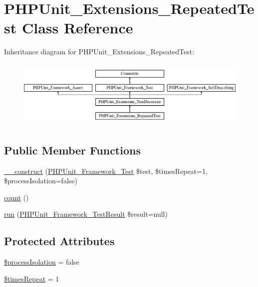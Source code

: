 \hypertarget{class_p_h_p_unit___extensions___repeated_test}{}\section{P\+H\+P\+Unit\+\_\+\+Extensions\+\_\+\+Repeated\+Test Class Reference}
\label{class_p_h_p_unit___extensions___repeated_test}
Inheritance diagram for P\+H\+P\+Unit\+\_\+\+Extensions\+\_\+\+Repeated\+Test\+:\begin{figure}[H]
\begin{center}
\leavevmode
\includegraphics[height=3.303835cm]{class_p_h_p_unit___extensions___repeated_test}
\end{center}
\end{figure}
\subsection*{Public Member Functions}
\begin{DoxyCompactItemize}
\item 
\mbox{\hyperlink{class_p_h_p_unit___extensions___repeated_test_af5e8d5e2fa6ca2bbdbeeb608ba5b6ecb}{\+\_\+\+\_\+construct}} (\mbox{\hyperlink{interface_p_h_p_unit___framework___test}{P\+H\+P\+Unit\+\_\+\+Framework\+\_\+\+Test}} \$test, \$times\+Repeat=1, \$process\+Isolation=false)
\item 
\mbox{\hyperlink{class_p_h_p_unit___extensions___repeated_test_ac751e87b3d4c4bf2feb03bee8b092755}{count}} ()
\item 
\mbox{\hyperlink{class_p_h_p_unit___extensions___repeated_test_aba2e5a83092b40735a7a61c572cd6256}{run}} (\mbox{\hyperlink{class_p_h_p_unit___framework___test_result}{P\+H\+P\+Unit\+\_\+\+Framework\+\_\+\+Test\+Result}} \$result=null)
\end{DoxyCompactItemize}
\subsection*{Protected Attributes}
\begin{DoxyCompactItemize}
\item 
\mbox{\hyperlink{class_p_h_p_unit___extensions___repeated_test_a576e4a39d03e8ecf14a62c37420e41ab}{\$process\+Isolation}} = false
\item 
\mbox{\hyperlink{class_p_h_p_unit___extensions___repeated_test_a85ba45fbac68ae5d22aa4c0634e55fa7}{\$times\+Repeat}} = 1
\end{DoxyCompactItemize}
